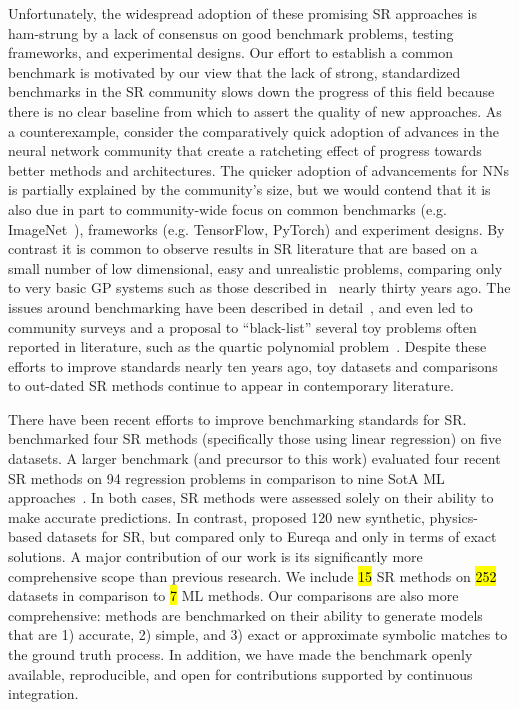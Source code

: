 
Unfortunately, the widespread adoption of these promising SR approaches is ham-strung by a lack of consensus on good benchmark problems, testing frameworks, and experimental designs. 
Our effort to establish a common benchmark is motivated by our view that the lack of strong, standardized benchmarks in the SR community slows down the progress of this field because there is no clear baseline from which to assert the quality of new approaches.
As a counterexample, consider the comparatively quick adoption of advances in the neural network community that create a ratcheting effect of progress towards better methods and architectures. 
The quicker adoption of advancements for NNs is partially explained by the community's size, but we would contend that it is also due in part to community-wide focus on common benchmarks (e.g. ImageNet~\cite{dengImagenetLargescaleHierarchical2009}), frameworks (e.g. TensorFlow, PyTorch) and experiment designs. 
By contrast it is common to observe results in SR literature that are based on a small number of low dimensional, easy and unrealistic problems, comparing only to very basic GP systems such as those described in~\cite{kozaGeneticProgrammingProgramming1992a} nearly thirty years ago.   
The issues around benchmarking have been described in detail~\cite{mcdermottGeneticProgrammingNeeds2012b}, and even led to community surveys and a proposal to ``black-list'' several toy problems often reported in literature, such as the quartic polynomial problem~\cite{whiteBetterGPBenchmarks2012a}.
Despite these efforts to improve standards nearly ten years ago, toy datasets and comparisons to out-dated SR methods continue to appear in contemporary literature.

There have been recent efforts to improve benchmarking standards for SR.
\citet{zegklitzBenchmarkingStateoftheartSymbolic2020} benchmarked four SR methods (specifically those using linear regression) on five datasets. 
A larger benchmark (and precursor to this work) evaluated four recent SR methods on 94 regression problems in comparison to nine SotA ML approaches~\cite{orzechowskiWhereAreWe2018}. 
In both cases, SR methods were assessed solely on their ability to make accurate predictions. 
In contrast, \citet{udrescuAIFeynmanPhysicsInspired2020} proposed 120 new synthetic, physics-based datasets for SR, but compared only to Eureqa and only in terms of exact solutions. 
A major contribution of our work is its significantly more comprehensive scope than previous research.
We include \hl{15} SR methods on \hl{252} datasets in comparison to \hl{7} ML methods. 
Our comparisons are also more comprehensive: methods are benchmarked on their ability to generate models that are 1) accurate, 2) simple, and 3) exact or approximate symbolic matches to the ground truth process. 
In addition, we have made the benchmark openly available, reproducible, and open for contributions supported by continuous integration. 

